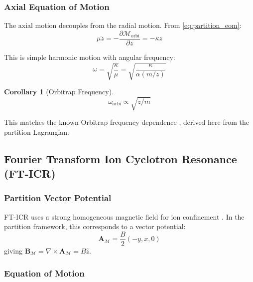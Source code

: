 \documentclass[twocolumn,10pt,a4paper]{article}
\newtheorem{corollary}[theorem]{Corollary}
\theoremstyle{definition}
\theoremstyle{remark}
\newcommand{\Mdepth}{\mathcal{M}}
\newcommand{\Apartition}{\mathbf{A}_{\mathcal{M}}}
\newcommand{\partinert}{\mu}
\begin{document}
\subsubsection{Axial Equation of Motion}

The axial motion decouples from the radial motion. From \eqref{eq:partition_eom}:
\begin{equation}
    \partinert\ddot{z} = -\frac{\partial \Mdepth_{\mathrm{orbi}}}{\partial z} = -\kappa z
    \label{eq:orbitrap_axial}
\end{equation}

This is simple harmonic motion with angular frequency:
\begin{equation}
    \omega = \sqrt{\frac{\kappa}{\partinert}} = \sqrt{\frac{\kappa}{\alpha(m/z)}}
    \label{eq:orbitrap_freq}
\end{equation}

\begin{corollary}[Orbitrap Frequency]
\begin{equation}
    \boxed{\omega_{\mathrm{orbi}} \propto \sqrt{z/m}}
\end{equation}
\end{corollary}

This matches the known Orbitrap frequency dependence \citep{makarov2000}, derived here from the partition Lagrangian.

\subsection{Fourier Transform Ion Cyclotron Resonance (FT-ICR)}

\subsubsection{Partition Vector Potential}

FT-ICR uses a strong homogeneous magnetic field for ion confinement \citep{marshall1998}. In the partition framework, this corresponds to a vector potential:
\begin{equation}
    \Apartition = \frac{B}{2}(-y, x, 0)
    \label{eq:icr_vector}
\end{equation}
giving $\mathbf{B}_{\Mdepth} = \nabla \times \Apartition = B\hat{z}$.

\subsubsection{Equation of Motion}
\end{document}
